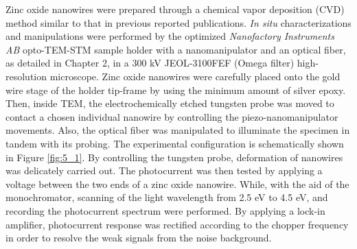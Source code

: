 Zinc oxide nanowires were prepared through a chemical vapor deposition (CVD) method similar to that in previous reported publications.\cite{Xu2015b}
{\em In situ} characterizations and manipulations were performed by the optimized {\em Nanofactory Instruments AB} opto-TEM-STM sample holder with a nanomanipulator and an optical fiber, as detailed in Chapter 2, in a 300 kV JEOL-3100FEF (Omega filter) high-resolution microscope. 
Zinc oxide nanowires were carefully placed onto the gold wire stage of the holder tip-frame by using the minimum amount of silver epoxy. 
Then, inside TEM, the electrochemically etched tungsten probe was moved to contact a chosen individual nanowire by controlling the piezo-nanomanipulator movements. Also, the optical fiber was manipulated to illuminate the specimen in tandem with its probing. 
The experimental configuration is schematically shown in Figure \ref{fig:5_1}. 
By controlling the tungsten probe, deformation of nanowires was delicately carried out. 
The photocurrent was then tested by applying a voltage between the two ends of a zinc oxide nanowire. While, with the aid of the monochromator, scanning of the light wavelength from 2.5 eV to 4.5 eV, and recording the photocurrent spectrum were performed. 
By applying a lock-in amplifier, photocurrent response was rectified according to the chopper frequency in order to resolve the weak signals from the noise background. 
\vfill %

